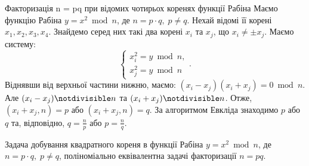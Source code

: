 \begin{algorithm}{Факторизація n = pq при відомих чотирьох коренях функції Рабіна}
Маємо функцію Рабіна $y = x ^{2} \bmod n$, де $n = p \cdot q,\; p \neq q$. Нехай відомі її корені $x_1, x_2, x_3, x_4$. Знайдемо серед них такі два корені $x_i$ та $x_j$, що $x_i \neq \pm x_j$. Маємо систему:
\begin{equation*}
\begin{cases}
        x^2_i = y \bmod n,\\
        x^2_j = y \bmod n
\end{cases}.
\end{equation*}
Віднявши від верхньої частини нижню, маємо: $(x_i-x_j)(x_i+x_j) = 0 \bmod n$. Але $(x_i-x_j) \notdivisible n$ та $(x_i+x_j) \notdivisible n$. Отже, $(x_i+x_j, n) = p$ або $(x_i+x_j, n) = q$.
За алгоритмом Евкліда знаходимо $p$ або $q$ та, відповідно, $q = \frac{n}{p}$ або $p = \frac{n}{q}$.
\end{algorithm}
\begin{claim}
Задача добування квадратного кореня в функції Рабіна $y = x ^{2} \bmod n$, де $n = p \cdot q,\; p \neq q$, поліноміально еквівалентна задачі факторизації $n = pq$.
\end{claim}